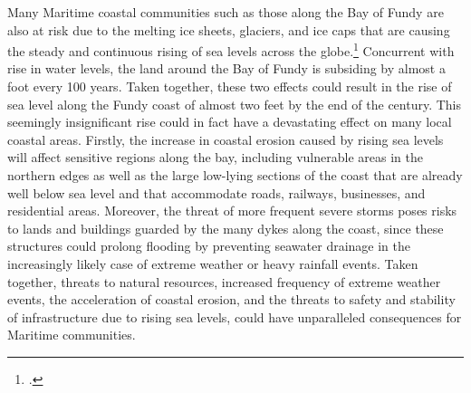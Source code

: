 Many Maritime coastal communities such as those along the Bay of Fundy are also at risk due to the melting ice sheets, glaciers, and ice caps that are causing the steady and continuous rising of sea levels across the globe.\footcite[][]{PercyRisingTide}
Concurrent with rise in water levels, the land around the Bay of Fundy is subsiding by almost a foot every 100 years.
Taken together, these two effects could result in the rise of sea level along the Fundy coast of almost two feet by the end of the century.
This seemingly insignificant rise could in fact have a devastating effect on many local coastal areas.
Firstly, the increase in coastal erosion caused by rising sea levels will affect sensitive regions along the bay, including vulnerable areas in the northern edges as well as the large low-lying sections of the coast that are already well below sea level and that accommodate roads, railways, businesses, and residential areas. 
Moreover, the threat of more frequent severe storms poses risks to lands and buildings guarded by the many dykes along the coast, since these structures could prolong flooding by preventing seawater drainage in the increasingly likely case of extreme weather or heavy rainfall events. 
Taken together, threats to natural resources, increased frequency of extreme weather events, the acceleration of coastal erosion, and the threats to safety and stability of infrastructure due to rising sea levels, could have unparalleled consequences for Maritime communities. 






